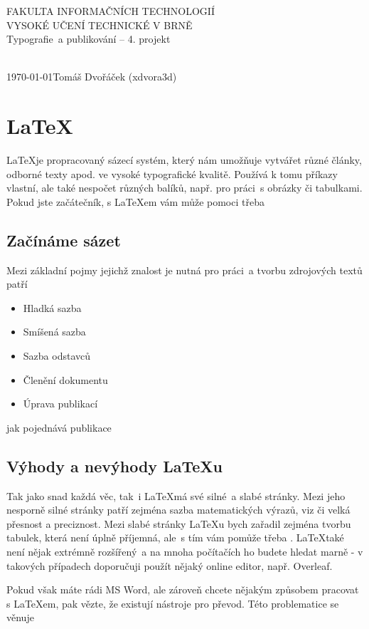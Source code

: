 \documentclass[a4paper,11pt]{article}
\begin{document}
\begin{titlepage}

\begin{center}
\renewcommand{\baselinestretch}{1.5}\normalsize
{\Huge {FAKULTA INFORMAČNÍCH TECHNOLOGIÍ \\ VYSOKÉ UČENÍ TECHNICKÉ V BRNĚ}}\\
{\LARGE Typografie~a publikování – 4. projekt \\
}
\\
\end{center}

{\LARGE \today \hfill Tomáš Dvořáček (xdvora3d)}


\end{titlepage}

\section{\LaTeX}

\LaTeX\space je propracovaný sázecí systém, který nám umožňuje vytvářet různé články, odborné texty apod. ve vysoké typografické kvalitě. Používá k tomu příkazy vlastní, ale také nespočet různých balíků, např. pro práci~s obrázky či tabulkami.
Pokud jste začátečník, s \LaTeX em vám může pomoci třeba \cite{Stefan}

\subsection{Začínáme sázet}
Mezi základní pojmy jejichž znalost je nutná pro práci~a tvorbu zdrojových textů patří
\begin{itemize}
    \item Hladká sazba
    \item Smíšená sazba
    \item Sazba odstavců
    \item Členění dokumentu
    \item Úprava publikací
\end{itemize}

\noindent jak pojednává publikace \cite{Rybicka}

\subsection{Výhody a nevýhody \LaTeX u}
Tak jako snad každá věc, tak~i \LaTeX\space má své silné~a slabé stránky. Mezi jeho nesporně silné stránky patří zejména sazba matematických výrazů, viz \cite{Kalvoda} či velká přesnost a preciznost.
Mezi slabé stránky \LaTeX u bych zařadil zejména tvorbu tabulek, která není úplně příjemná, ale~s tím vám pomůže třeba \cite{Sopuch}. \LaTeX\space také není nějak extrémně rozšířený~a na mnoha počítačích ho budete hledat marně - v takových případech doporučuji použít nějaký online editor, např. Overleaf.
\par Pokud však máte rádi MS Word, ale zároveň chcete nějakým způsobem pracovat s \LaTeX em, pak vězte, že existují nástroje pro převod. Této problematice se věnuje \cite{Simek}
\end{document}
